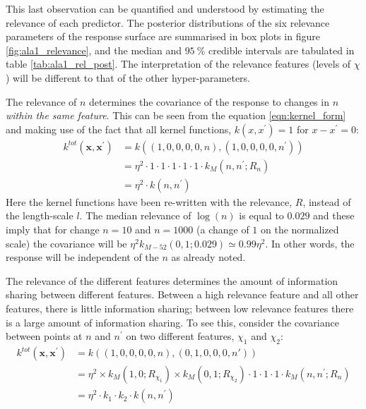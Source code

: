 This last observation can be quantified and understood by estimating the relevance of each predictor. The posterior distributions of the six relevance parameters of the response surface are summarised in box plots in figure \ref{fig:ala1_relevance}, and  the median and $\SI{95}{\percent}$ credible intervals  are tabulated in table \ref{tab:ala1_rel_post}. The interpretation of the relevance features (levels of $\chi$) will be different to that of the other hyper-parameters. 

The relevance of $n$ determines the covariance of the response to changes in $n$ \emph{within the same feature}. This can be seen from the equation \ref{eqn:kernel_form} and making use of the fact that all kernel functions, $k(x, x^{\prime})=1$ for $x-x^{\prime}=0$:
\begin{equation*}
\begin{split}
    k^{tot}(\mathbf{x}, \mathbf{x}^{\prime})& = k\left((1, 0, 0, 0, 0, n), (1, 0, 0, 0, 0, n^{\prime})\right) \\
    & = \eta^{2}\cdot 1 \cdot 1\cdot 1 \cdot 1\cdot 1 \cdot k_{M}(n, n^{\prime}; R_{n}) \\
    & = \eta^{2}\cdot k(n, n^{\prime})
\end{split}
\end{equation*}
Here the kernel functions have been re-written with the relevance, $R$, instead of the length-scale $l$. The median relevance of $\log{(n)}$ is equal to $\num{0.029}$ and these imply that for change $n=10$ and $n=1000$ (a change of $1$ on the normalized scale) the covariance will be $\eta^{2}k_{M-52}(0,1; 0.029) \simeq 0.99\eta^{2}$. In other words, the response will be independent of the $n$ as already noted. 

The relevance of the different features determines the amount of information sharing between different features. Between a high relevance feature and all other features, there is little information sharing; between low relevance features there is a large amount of information sharing. To see this, consider the covariance between points at $n$ and $n^{\prime}$ on two different features, $\chi_1$ and $\chi_2$: 
\begin{equation*}
\begin{split}
    k^{tot}(\mathbf{x}, \mathbf{x}^{\prime})& = k\left((1, 0, 0, 0, 0, n), (0, 1, 0, 0, 0, n')\right) \\
    & = \eta^{2}\times k_{M}\left(1, 0; R_{\chi_1}\right) \times k_{M}\left(0, 1; R_{\chi_2}\right) \cdot 1 \cdot 1\cdot 1 \cdot k_{M}(n, n^{\prime}; R_{n}) \\
    &=  \eta^{2}\cdot k_{1}\cdot k_{2}\cdot k(n, n^{\prime})
\end{split}
\end{equation*}

